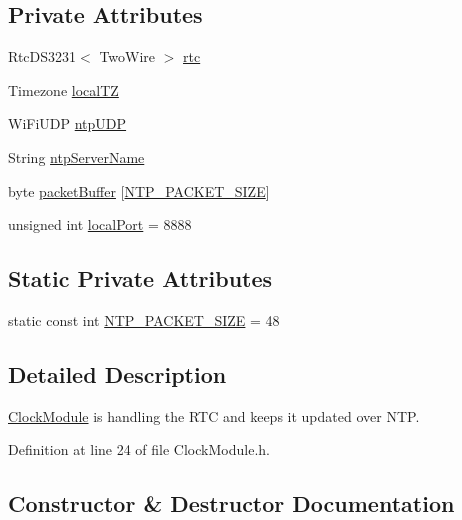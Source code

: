 \subsection*{Private Attributes}
\begin{DoxyCompactItemize}
\item 
Rtc\+D\+S3231$<$ Two\+Wire $>$ \mbox{\hyperlink{class_clock_module_a191d985f5169622e48f7babba844bd60}{rtc}}
\item 
Timezone \mbox{\hyperlink{class_clock_module_a6fc4d5d14eec707268959c3e482dae3e}{local\+TZ}}
\item 
Wi\+Fi\+U\+DP \mbox{\hyperlink{class_clock_module_ac6af65f52509d43d767fde9e307f5118}{ntp\+U\+DP}}
\item 
String \mbox{\hyperlink{class_clock_module_ae8b741cfeb6577eee023e28359acca0f}{ntp\+Server\+Name}}
\item 
byte \mbox{\hyperlink{class_clock_module_a51e755c2014a01ab68c58c1bcbea5184}{packet\+Buffer}} \mbox{[}\mbox{\hyperlink{class_clock_module_ab12ec0e0e1a0a02861feae0272840cff}{N\+T\+P\+\_\+\+P\+A\+C\+K\+E\+T\+\_\+\+S\+I\+ZE}}\mbox{]}
\item 
unsigned int \mbox{\hyperlink{class_clock_module_a0ea28a7086d25b525ae2ae7e8ac05004}{local\+Port}} = 8888
\end{DoxyCompactItemize}
\subsection*{Static Private Attributes}
\begin{DoxyCompactItemize}
\item 
static const int \mbox{\hyperlink{class_clock_module_ab12ec0e0e1a0a02861feae0272840cff}{N\+T\+P\+\_\+\+P\+A\+C\+K\+E\+T\+\_\+\+S\+I\+ZE}} = 48
\end{DoxyCompactItemize}


\subsection{Detailed Description}
\mbox{\hyperlink{class_clock_module}{Clock\+Module}} is handling the R\+TC and keeps it updated over N\+TP. 

Definition at line 24 of file Clock\+Module.\+h.



\subsection{Constructor \& Destructor Documentation}
\mbox{\label{class_clock_module_a13599210b0032bbc5312d93e690c763b}} 
